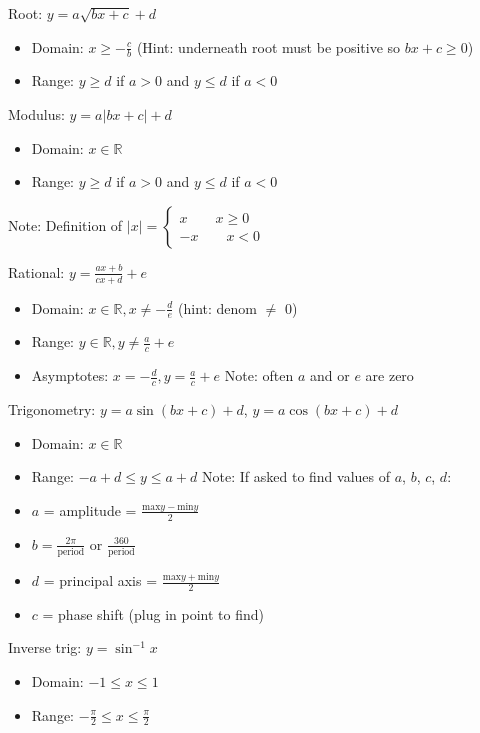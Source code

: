 \documentclass[10pt,a4paper,oneside]{book}
\begin{document}
Root: $y=a\sqrt{bx+c}+d$
\begin{itemize}
    \item Domain: $x\geq -\frac{c}{b}$ (Hint: underneath root must be positive so $bx+c\geq 0$)
    \item Range: $y\geq d$ if $a>0$ and $y\leq d$ if $a<0$
\end{itemize}

Modulus: $y=a|bx+c|+d$
\begin{itemize}
    \item Domain: $x\in \mathbb{R}$
    \item Range: $y\geq d$ if $a>0$ and $y\leq d$ if $a<0$
\end{itemize}
Note: Definition of $|x|=\begin{cases}
    x \qquad x\geq 0 \\ 
    -x \qquad x<0 
\end{cases}$

Rational: $y=\frac{ax+b}{cx+d}+e$
\begin{itemize}
    \item Domain: $x\in \mathbb{R}, x\neq -\frac{d}{e}$ (hint: denom $\neq$ 0)
    \item Range: $y\in \mathbb{R}, y\neq\frac{a}{c}+e$
    \item Asymptotes: $x=-\frac{d}{c}, y=\frac{a}{c}+e$
    Note: often $a$ and or $e$ are zero
\end{itemize}

Trigonometry: $y=a\sin(bx+c)+d$, $y=a\cos(bx+c)+d$
\begin{itemize}
    \item Domain: $x\in \mathbb{R}$
    \item Range: $-a+d\leq y\leq a+d$
    Note: If asked to find values of $a$, $b$, $c$, $d$:
    \item $a$ = amplitude = $\frac{\text{max} y - \text{min} y}{2}$
    \item $b=\frac{2\pi}{\text{period}}$ or $\frac{360}{\text{period}}$
    \item $d$ = principal axis = $\frac{\text{max} y + \text{min}y}{2}$
    \item $c$ = phase shift (plug in point to find) 
\end{itemize}

Inverse trig: $y=\sin^{-1}x$
\begin{itemize}
    \item Domain: $-1\leq x\leq 1$
    \item Range: $-\frac{\pi}{2}\leq x\leq \frac{\pi}{2}$
\end{itemize}
\end{document}
